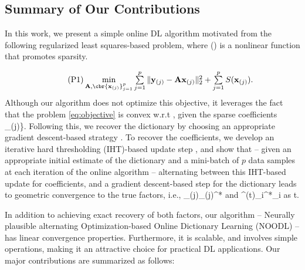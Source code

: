 \documentclass{article}
\def\[#1\]{{$#1$}}
\def\b#1{{\mathbf{#1}}}
\begin{document}
\vspace{-3pt}
\subsection{Summary of Our Contributions}
\vspace{-3pt}



In this work,  we present a simple online DL algorithm motivated from the following regularized least squares-based problem, where \[S(\cdot)\] is a nonlinear function that promotes sparsity.

\vspace*{-2pt}
\begin{align}\tag{P1}\label{eq:objective}
\textstyle \min\limits_{\b{A}, \cbr{\b{x}_{(j)}}_{j=1}^p } \sum\limits_{j = 1}^{p}\|\b{y}_{(j)} - \b{A}\b{x}_{(j)}\|^2_2 + \sum\limits_{j=1}^{p}S(\b{x}_{(j)}).\vspace*{-2pt}
\end{align}
 Although our algorithm does not optimize this objective, it leverages the fact that the problem \eqref{eq:objective} is convex w.r.t \[\b{A}\], given the sparse coefficients \[\{\b{x}_{(j)}\}\]. Following this, we recover the dictionary by choosing an appropriate gradient descent-based strategy \citep{Arora15, Engan1999}. 
To recover the coefficients, we develop an iterative hard thresholding (IHT)-based update step \citep{Haupt2006, Blumensath09}, and show that -- given an appropriate initial estimate of the dictionary and a mini-batch of $p$ data samples at each iteration \[t\] of the online algorithm -- alternating between this IHT-based update for coefficients, and a gradient descent-based step for the dictionary leads to geometric convergence to the true factors, i.e., \[\hspace{-1pt}\b{x}_{(j)}\hspace{-2pt}{\tiny\rightarrow}\b{x}_{(j)}^*\hspace{-2pt}\] and \[\b{A}^{(t)}_i{\hspace{-2pt}\tiny\rightarrow}\b{A}^*_i\hspace{-2pt}\] as \[\hspace{-1pt}t{\tiny\rightarrow}\hspace{-0pt}\infty\].







In addition to achieving exact recovery of both factors, our algorithm -- Neurally plausible alternating Optimization-based Online Dictionary Learning (NOODL) -- has linear convergence properties. Furthermore, it is scalable, and involves simple operations, making it an attractive choice for practical DL applications. Our major contributions are summarized as follows:
\end{document}
